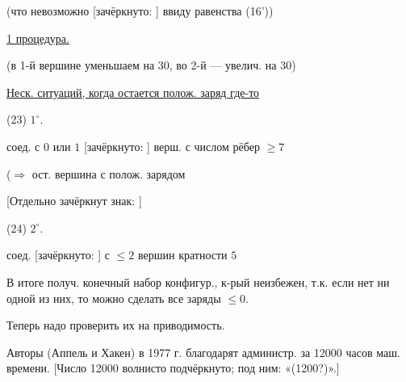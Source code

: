 (что невозможно [зачёркнуто: ] ввиду равенства (16'))

\underline{1 процедура.}

\begin{center}
\end{center}
(в 1-й вершине уменьшаем на 30,
во 2-й — увелич. на 30)

\underline{Неск. ситуаций, когда остается полож. заряд где-то}

(23) $1^{\circ}$.
соед. с $0$ или $1$ [зачёркнуто: ] верш. с числом рёбер $\geq7$

($\Rightarrow$ ост. вершина с полож. зарядом

[Отдельно зачёркнут знак: ]

(24) $2^{\circ}$.
соед. [зачёркнуто: ] с $\leq2$ вершин кратности $5$

В итоге получ. конечный набор конфигур., к-рый неизбежен,
т.к. если нет ни одной из них, то можно сделать все
заряды $\leq0$.




Теперь надо проверить их на приводимость.

Авторы (Аппель и Хакен) в 1977 г. благодарят администр.
за 12000 часов маш. времени.
[Число 12000 волнисто подчёркнуто; под ним: «(1200?)».]

